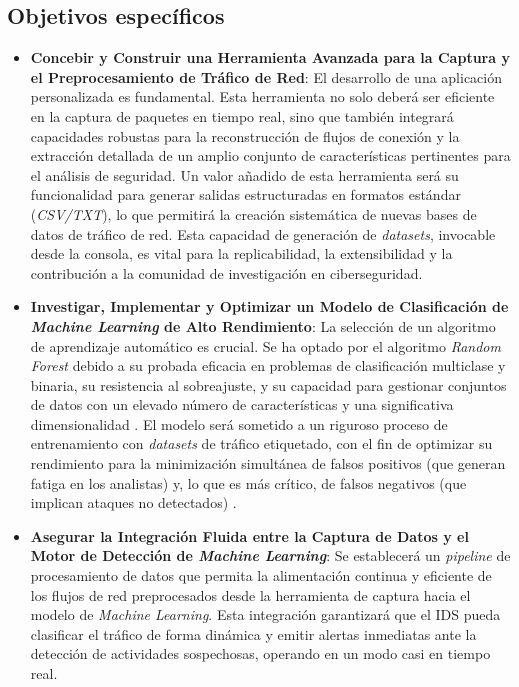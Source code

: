 \subsection*{Objetivos específicos}
\begin{itemize}

    \item\textbf{Concebir y Construir una Herramienta Avanzada para la Captura y el Preprocesamiento de Tráfico de Red}: El desarrollo de una aplicación personalizada es fundamental. Esta herramienta no solo deberá ser eficiente en la captura de paquetes en tiempo real, sino que también integrará capacidades robustas para la reconstrucción de flujos de conexión y la extracción detallada de un amplio conjunto de características pertinentes para el análisis de seguridad. Un valor añadido de esta herramienta será su funcionalidad para generar salidas estructuradas en formatos estándar (\emph{CSV/TXT}), lo que permitirá la creación sistemática de nuevas bases de datos de tráfico de red. Esta capacidad de generación de \textit{datasets}, invocable desde la consola, es vital para la replicabilidad, la extensibilidad y la contribución a la comunidad de investigación en ciberseguridad.
    
    \item\textbf{Investigar, Implementar y Optimizar un Modelo de Clasificación de \textit{Machine Learning} de Alto Rendimiento}: La selección de un algoritmo de aprendizaje automático es crucial. Se ha optado por el algoritmo \textit{Random Forest} debido a su probada eficacia en problemas de clasificación multiclase y binaria, su resistencia al sobreajuste, y su capacidad para gestionar conjuntos de datos con un elevado número de características y una significativa dimensionalidad \cite{Breiman2001RandomForests}. El modelo será sometido a un riguroso proceso de entrenamiento con \textit{datasets} de tráfico etiquetado, con el fin de optimizar su rendimiento para la minimización simultánea de falsos positivos (que generan fatiga en los analistas) y, lo que es más crítico, de falsos negativos (que implican ataques no detectados) \cite{PolaniaArias2021EvaluacionMLIDS}.
    
    \item\textbf{Asegurar la Integración Fluida entre la Captura de Datos y el Motor de Detección de \textit{Machine Learning}}: Se establecerá un \textit{pipeline} de procesamiento de datos que permita la alimentación continua y eficiente de los flujos de red preprocesados desde la herramienta de captura hacia el modelo de \textit{Machine Learning}. Esta integración garantizará que el IDS pueda clasificar el tráfico de forma dinámica y emitir alertas inmediatas ante la detección de actividades sospechosas, operando en un modo casi en tiempo real.
    

\end{itemize}
